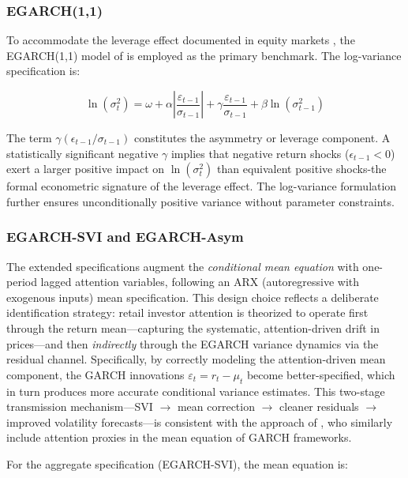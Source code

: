 \documentclass[12pt, a4paper]{article}
\begin{document}
\subsubsection{EGARCH(1,1)}

To accommodate the leverage effect documented in equity markets \citep{black1976}, the EGARCH(1,1) model of \citet{nelson1991} is employed as the primary benchmark. The log-variance specification is:

\begin{equation}
  \ln(\sigma^{2}_{t}) = \omega
  + \alpha\left|\frac{\varepsilon_{t-1}}{\sigma_{t-1}}\right|
  + \gamma\frac{\varepsilon_{t-1}}{\sigma_{t-1}}
  + \beta\ln(\sigma^{2}_{t-1})
  \label{eq:egarch}
\end{equation}

The term $\gamma(\epsilon_{t-1}/\sigma_{t-1})$ constitutes the asymmetry or leverage component. A statistically significant negative $\gamma$ implies that negative return shocks ($\epsilon_{t-1} < 0$) exert a larger positive impact on $\ln(\sigma^2_t)$ than equivalent positive shocks-the formal econometric signature of the leverage effect. The log-variance formulation further ensures unconditionally positive variance without parameter constraints.

\subsubsection{EGARCH-SVI and EGARCH-Asym}

The extended specifications augment the \textit{conditional mean equation} with one-period lagged attention variables, following an ARX (autoregressive with exogenous inputs) mean specification. This design choice reflects a deliberate identification strategy: retail investor attention is theorized to operate first through the return mean—capturing the systematic, attention-driven drift in prices—and then \textit{indirectly} through the EGARCH variance dynamics via the residual channel. Specifically, by correctly modeling the attention-driven mean component, the GARCH innovations $\varepsilon_t = r_t - \mu_t$ become better-specified, which in turn produces more accurate conditional variance estimates. This two-stage transmission mechanism—SVI $\to$ mean correction $\to$ cleaner residuals $\to$ improved volatility forecasts—is consistent with the approach of \citet{hamid2015}, who similarly include attention proxies in the mean equation of GARCH frameworks.

For the aggregate specification (EGARCH-SVI), the mean equation is:
\end{document}
